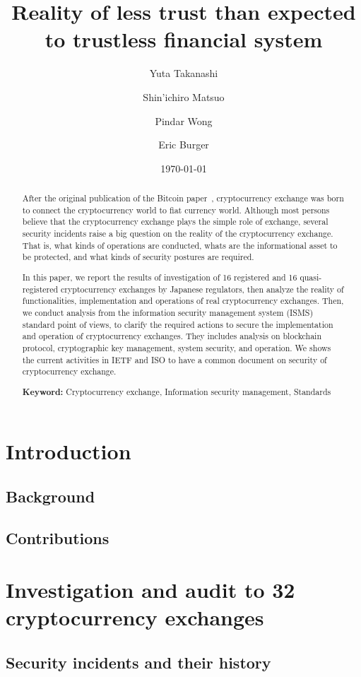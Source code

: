 \documentclass[english]{llncs}
\title{Reality of less trust than expected to trustless financial system}
\author{
Yuta Takanashi\inst{1,2}\and Shin'ichiro Matsuo \inst{1} \and Pindar Wong\inst{3} \and Eric Burger\inst{1}}
\institute{Georgetown University
\and Financial Services Agency
\and VeriFi Ltd.}
\date{\today}
\begin{document}
\maketitle

\begin{abstract}
After the original publication of the Bitcoin paper~\cite{N08}, cryptocurrency exchange was born to connect the cryptocurrency world 
to fiat currency world. Although most persons believe that the cryptocurrency exchange plays the simple role of exchange, 
several security incidents raise a big question on the reality of the cryptocurrency exchange. That is, what kinds of operations
are conducted, whats are the informational asset to be protected, and what kinds of security postures are required.

In this paper, we report the results of investigation of 16 registered and 16 quasi-registered cryptocurrency
exchanges by Japanese regulators, then analyze the reality of functionalities, implementation and operations of real cryptocurrency exchanges.
Then, we conduct analysis from the information security management system (ISMS) standard point of views, to clarify
the required actions to secure the implementation and operation of cryptocurrency exchanges. They includes analysis on
blockchain protocol, cryptographic key management, system security, and operation. We shows the current activities in IETF and 
ISO to have a common document on security of cryptocurrency exchange.

{\bf Keyword:} Cryptocurrency exchange, Information security management, Standards
\end{abstract}

\section{Introduction}          
\subsection{Background}


\subsection{Contributions}

\section{Investigation and audit to 32 cryptocurrency exchanges}
\subsection{Security incidents and their history}
\end{document}
